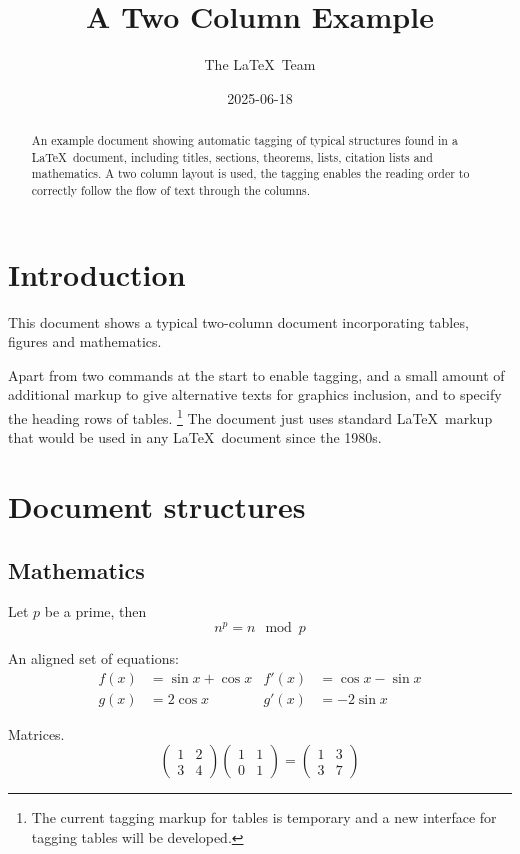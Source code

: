 \documentclass[a4paper,twocolumn]{article}
\begin{document}
\title{A Two Column Example}
\date{2025-06-18}
\author{The \LaTeX\ Team}

\pagestyle{headings}

\maketitle

\begin{abstract}
  An example document showing automatic tagging of typical structures
  found in a \LaTeX\ document, including titles, sections, theorems, lists,
  citation lists and mathematics. A two column layout is used, the
  tagging enables the reading order to correctly follow the flow of
  text through the columns.
\end{abstract}

\tableofcontents

\section{Introduction}

This document shows a typical two-column document incorporating tables, figures and mathematics.

Apart from two commands at the start to enable tagging, and a small
amount of additional markup to give alternative texts for graphics
inclusion, and to specify the heading rows of tables.%
\footnote{The current tagging markup for tables is temporary and a new interface
for tagging tables will be developed.} The document
just uses standard \LaTeX\ markup that would be used in any \LaTeX\
document since the 1980s.

\section{Document structures}

\subsection{Mathematics}

Let $p$ be a prime, then
\[n^p=n \mod p\]

An aligned set of equations:
\begin{align}
  f(x)&=\sin x + \cos x  & f'(x) &=\cos x - \sin x \\
  g(x)&=2\cos x          & g'(x) &= -2\sin x 
\end{align}

Matrices.
\[
\begin{pmatrix}1&2\\3&4\end{pmatrix}
\begin{pmatrix}1&1\\0&1\end{pmatrix}
=
\begin{pmatrix}1&3\\3&7\end{pmatrix}
\]
\end{document}
